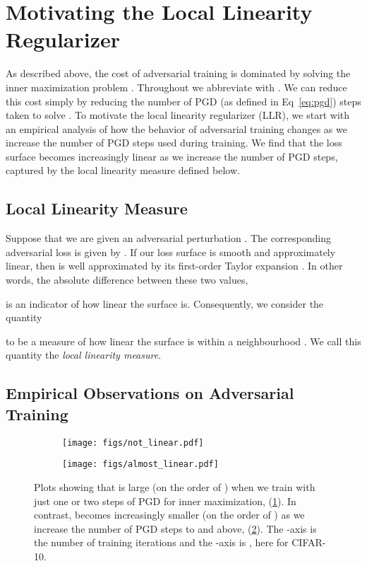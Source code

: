 \documentclass{article}
\theoremstyle{plain}
\theoremstyle{definition}
\theoremstyle{remark}
\begin{document}
 \section{Motivating the Local Linearity Regularizer}\label{sec:more_linear}
As described above, the cost of adversarial training is dominated by solving the inner maximization problem . Throughout we abbreviate  with . We can reduce this cost simply by reducing the number of PGD (as defined in Eq~\eqref{eq:pgd}) steps  taken to solve . To motivate the local linearity regularizer (LLR), we start with an empirical analysis of how the behavior of adversarial training changes as we increase the number of PGD steps used during training. We find that the loss surface becomes increasingly linear as we increase the number of PGD steps, captured by the local linearity measure defined below.

\subsection{Local Linearity Measure}
Suppose that we are given an adversarial perturbation . The corresponding adversarial loss is given by . If our loss surface is smooth and approximately linear, then  is well approximated by its first-order Taylor expansion .
In other words, the absolute difference between these two values,

is an indicator of how linear the surface is. Consequently, we consider the quantity

to be a measure of how linear the surface is within a neighbourhood . We call this quantity the \textit{local linearity measure}. 

\subsection{Empirical Observations on Adversarial Training}\label{sec:adv_train_analysis}
\begin{figure}[htb]
    \centering
    \hspace{-1cm}
    \begin{subfigure}[b]{0.48\textwidth}
    \centering
    \texttt{[image: figs/not\_linear.pdf]}\caption{}\label{subfig:linear_not}
    \end{subfigure}
    \begin{subfigure}[b]{0.48\textwidth}
    \centering
    \texttt{[image: figs/almost\_linear.pdf]}\caption{}\label{subfig:linear}
    \end{subfigure}
    \caption{\small{Plots showing that  is large (on the order of ) when we train with just one or two steps of PGD for inner maximization, (\ref{subfig:linear_not}). In contrast,  becomes increasingly smaller (on the order of ) as we increase the number of PGD steps to  and above, (\ref{subfig:linear}). The -axis is the number of training iterations and the -axis is , here  for CIFAR-10.}}
    \label{fig:obfuscation_vs_smooth}
\end{figure}
\end{document}
